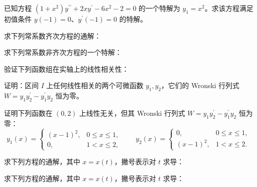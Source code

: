 \newpage
\noindent\begin{minipage}{\textwidth}
已知方程 $(1+x^2)y^{\prime\prime}+2xy^{\prime}-6x^2-2=0$ 的一个特解为 $y_1=x^2$。求该方程满足初值条件 $y(-1)=0$、$y^{\prime}(-1)=0$ 的特解。
\end{minipage}\par\vfill
\noindent\begin{minipage}{\textwidth}
求下列常系数齐次方程的通解：
\end{minipage}\par\vfill
\noindent\begin{minipage}{\textwidth}
求下列常系数非齐次方程的一个特解：
\end{minipage}\par\vfill
\noindent\begin{minipage}{\textwidth}
验证下列函数组在实轴上的线性相关性：
\end{minipage}\par\vfill
\newpage
\noindent\begin{minipage}{\textwidth}
证明：区间 $I$ 上任何线性相关的两个可微函数 $y_1,y_2$，它们的 Wronski 行列式 $W=y_1y_2^{\prime}-y_1^{\prime}y_2$ 恒为零。
\end{minipage}\par\vfill
\noindent\begin{minipage}{\textwidth}
证明下列函数在 $(0,2)$ 上线性无关，但其 Wronski 行列式 $W=y_1y_2^{\prime}-y_1^{\prime}y_2$ 恒为零：\[y_1(x)=\begin{cases}(x-1)^2,&0\le x\le1,\\0,&1<x\le2,\end{cases}\qquad y_2(x)=\begin{cases}0,&0\le x\le1,\\(x-1)^2,&1<x\le2.\end{cases}\]
\end{minipage}\par\vfill
\noindent\begin{minipage}{\textwidth}
求下列方程的通解，其中 $x=x(t)$，撇号表示对 $t$ 求导：
\end{minipage}\par\vfill
\noindent\begin{minipage}{\textwidth}
求下列方程的通解，其中 $x=x(t)$，撇号表示对 $t$ 求导：
\end{minipage}\par\vfill
